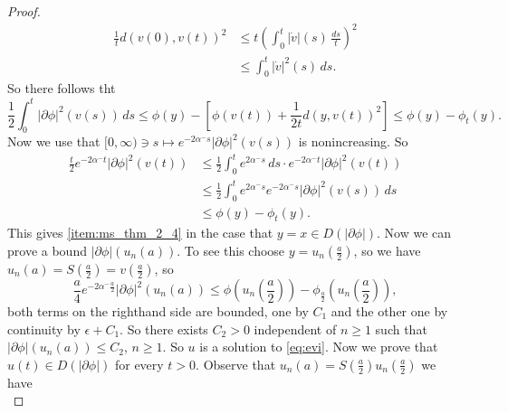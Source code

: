 \documentclass[a4paper,11pt, leqno]{scrreprt} %
\renewcommand{\leq}{\leqslant}
\renewcommand{\leq}{\leqslant}
\renewcommand{\geq}{\geqslant}
\theoremstyle{change}
\theoremstyle{nonumberplain}
\newtheorem{proof}{Proof}
\begin{document}
\begin{proof}
  \begin{equation}
    \label{eq:ms_thm_2_30}
    \begin{split}
      \frac{1}{t} d(v(0), v(t))^2 &\leq t \left ( \int_0^t |\dot v|(s) \,
        \frac{ds}{t} \right )^2\\
      &\leq \int_0^t |\dot v|^2(s) \, ds.
    \end{split}
  \end{equation}
  So there follows tht
  \begin{equation}
    \label{eq:ms_thm_2_31}
    \frac12 \int_0^t |\partial \phi|^2(v(s)) \, ds \leq \phi(y) -
    \left [ \phi(v(t)) + \frac{1}{2t} d(y, v(t))^2 \right ] \leq
    \phi(y) - \phi_t(y).
  \end{equation}
  Now we use that $[0, \infty) \ni s \mapsto e^{-2 \alpha^- s} |\partial
  \phi|^2(v(s))$ is nonincreasing. So
  \begin{equation}
    \label{eq:ms_thm_2_32}
    \begin{split}
      \frac{t}{2} e^{-2 \alpha^- t} |\partial \phi|^2(v(t)) & \leq
      \frac12 \int_0^t e^{2 \alpha^- s} \, ds \cdot e^{-2 \alpha^- t}
      |\partial \phi|^2(v(t))\\
      &\leq \frac12 \int_0^t e^{2 \alpha^- s} e^{-2 \alpha^- s}
      |\partial \phi|^2(v(s)) \, ds\\
      &\leq \phi(y) - \phi_t(y).
    \end{split}
  \end{equation}
  This gives \ref{item:ms_thm_2_4} in the case that $y = x \in
  D(|\partial \phi|)$. Now we can prove a bound $|\partial
  \phi|(u_n(a))$. To see this choose $y = u_n \left ( \frac{a}2 \right
  )$, so we have $u_n(a) = S \left (\frac{a}2 \right ) = v \left (
  \frac{a}2 \right )$, so
  \begin{equation}
    \label{eq:ms_thm_2_33}
    \frac{a}{4} e^{-2 \alpha^- \frac{a}{2}} |\partial \phi|^2(u_n(a))
    \leq \phi \left ( u_n \left ( \frac{a}2 \right ) \right ) - \phi_{\frac{a}{2}} \left ( u_n \left ( \frac{a}2 \right ) \right ),
  \end{equation}
  both terms on the righthand side are bounded, one by $C_1$ and the
  other one by continuity by $\epsilon + C_1$. So there exists $C_2 >
  0$ independent of $n \geq 1$ such that $|\partial \phi|(u_n(a)) \leq
  C_2$, $n \geq 1$. So $u$ is a solution to \eqref{eq:evi}. Now we
  prove that $u(t) \in D(|\partial \phi|)$ for every $t > 0$. Observe
  that $u_n(a) = S \left ( \frac{a}{2} \right ) u_n \left (
    \frac{a}{2} \right )$ we have 
  \begin{equation}

\end{equation}
\end{proof}
\end{document}
